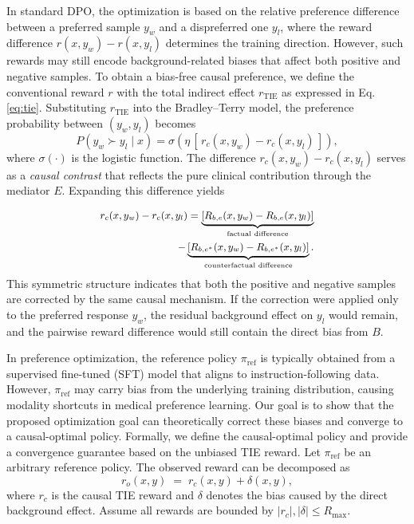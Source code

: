 In standard DPO, the optimization is based on the relative preference difference 
between a preferred sample $y_w$ and a dispreferred one $y_l$, where the reward difference $r(x,y_w)-r(x,y_l)$ determines the training direction. However, such rewards may still encode background-related biases that affect both positive and negative samples. To obtain a bias-free causal preference, we define the conventional reward $r$ 
with the total indirect effect $r_\text{TIE}$ as expressed in Eq. \ref{eq:tie}. Substituting $r_{\text{TIE}}$ into the Bradley--Terry model, the preference probability between $(y_w,y_l)$ becomes
\begin{equation}
P(y_w \succ y_l \mid x)
= \sigma\!\left(\eta\,[\,r_{c}(x,y_w)-r_{c}(x,y_l)\,]\right),
\end{equation}
where $\sigma(\cdot)$ is the logistic function. 
The difference $r_{c}(x,y_w)-r_{c}(x,y_l)$ serves as a \textit{causal contrast} that reflects the pure clinical contribution through the mediator $E$. Expanding this difference yields

\begin{equation}
\small
\begin{aligned}
    r_{c}(x,y_w)-r_{c}(x,y_l)
= \underbrace{[R_{b,e}(x,y_w)-R_{b,e}(x,y_l)]}_{\text{factual difference}}
 &\\-\underbrace{[R_{b,e^*}(x,y_w)-R_{b,e^*}(x,y_l)]}_{\text{counterfactual difference}}.
\end{aligned} 
\label{eq:preference}
\end{equation}
This symmetric structure indicates that both the positive and negative samples 
are corrected by the same causal mechanism.  
If the correction were applied only to the preferred response $y_w$, 
the residual background effect on $y_l$ would remain, 
and the pairwise reward difference would still contain the direct bias from $B$. 

In preference optimization, the reference policy
$\pi_{\text{ref}}$ is typically obtained from a supervised fine-tuned (SFT) model that aligns to instruction-following data. However, $\pi_{\text{ref}}$ may carry bias from the underlying training distribution, causing modality shortcuts in medical preference learning. Our goal is to show that the proposed optimization goal can theoretically correct these biases and converge to a causal-optimal policy. Formally, we define the causal-optimal policy and provide a convergence guarantee based on the unbiased TIE reward. Let $\pi_{\text{ref}}$ be an arbitrary reference policy. The observed reward can be decomposed as
\[
r_o(x,y) \;=\; r_c(x,y) + \delta(x,y),
\]
where $r_c$ is the causal TIE reward
and $\delta$ denotes the bias caused by the direct background effect.
Assume all rewards are bounded by $|r_c|,|\delta|\le R_{\max}$.


